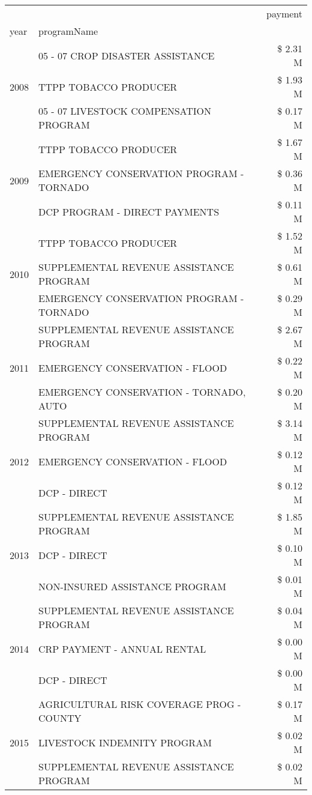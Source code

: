 \begin{tabular}{llr}
\toprule
 &  & payment \\
year & programName &  \\
\midrule
\multirow[t]{3}{*}{2008} & 05 - 07 CROP DISASTER ASSISTANCE & \$ 2.31 M \\
 & TTPP TOBACCO PRODUCER & \$ 1.93 M \\
 & 05 - 07 LIVESTOCK COMPENSATION PROGRAM & \$ 0.17 M \\
\cline{1-3}
\multirow[t]{3}{*}{2009} & TTPP TOBACCO PRODUCER & \$ 1.67 M \\
 & EMERGENCY CONSERVATION PROGRAM - TORNADO & \$ 0.36 M \\
 & DCP PROGRAM - DIRECT PAYMENTS & \$ 0.11 M \\
\cline{1-3}
\multirow[t]{3}{*}{2010} & TTPP TOBACCO PRODUCER & \$ 1.52 M \\
 & SUPPLEMENTAL REVENUE ASSISTANCE PROGRAM & \$ 0.61 M \\
 & EMERGENCY CONSERVATION PROGRAM - TORNADO & \$ 0.29 M \\
\cline{1-3}
\multirow[t]{3}{*}{2011} & SUPPLEMENTAL REVENUE ASSISTANCE PROGRAM & \$ 2.67 M \\
 & EMERGENCY CONSERVATION - FLOOD & \$ 0.22 M \\
 & EMERGENCY CONSERVATION - TORNADO, AUTO & \$ 0.20 M \\
\cline{1-3}
\multirow[t]{3}{*}{2012} & SUPPLEMENTAL REVENUE ASSISTANCE PROGRAM & \$ 3.14 M \\
 & EMERGENCY CONSERVATION - FLOOD & \$ 0.12 M \\
 & DCP - DIRECT & \$ 0.12 M \\
\cline{1-3}
\multirow[t]{3}{*}{2013} & SUPPLEMENTAL REVENUE ASSISTANCE PROGRAM & \$ 1.85 M \\
 & DCP - DIRECT & \$ 0.10 M \\
 & NON-INSURED ASSISTANCE PROGRAM & \$ 0.01 M \\
\cline{1-3}
\multirow[t]{3}{*}{2014} & SUPPLEMENTAL REVENUE ASSISTANCE PROGRAM & \$ 0.04 M \\
 & CRP PAYMENT - ANNUAL RENTAL & \$ 0.00 M \\
 & DCP - DIRECT & \$ 0.00 M \\
\cline{1-3}
\multirow[t]{3}{*}{2015} & AGRICULTURAL RISK COVERAGE PROG - COUNTY & \$ 0.17 M \\
 & LIVESTOCK INDEMNITY PROGRAM & \$ 0.02 M \\
 & SUPPLEMENTAL REVENUE ASSISTANCE PROGRAM & \$ 0.02 M \\

\end{tabular}
